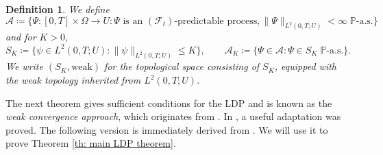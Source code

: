 \documentclass{amsart}
\newcommand{\<}{\langle}
\newcommand{\?}{\rangle}
\theoremstyle{plain}
\theoremstyle{remark}
\theoremstyle{plain}
\newtheorem{definition}[theorem]{Definition}
\numberwithin{equation}{section}
\newcommand{\F}{\mathcal{F}}
\renewcommand{\P}{\mathbb{P}}
\newcommand{\Om}{\Omega}
\begin{document}
\begin{definition}\label{def: S_K A_K}
We define
\[
\mathcal{A}\coloneqq \{\Psi\colon [0,T]\times \Om\to U : \Psi \text{ is an } (\F_t)\text{-predictable process}, \|\Psi\|_{L^2(0,T;U)}<\infty \; \P\text{-a.s.}\}
\]
and for $K>0$,
\[
S_K\coloneqq \{\psi\in L^2(0,T;U) : \|\psi\|_{L^2(0,T;U)}\leq K\},\qquad \mathcal{A}_K\coloneqq \{\Psi\in\mathcal{A}: \Psi\in S_K \; \P\text{-a.s.}\}.
\]
We write $(S_K,\mathrm{weak})$ for the topological space consisting of $S_K$, equipped with the weak topology inherited from $L^2(0,T;U)$.
\end{definition}

The next theorem gives sufficient conditions for the LDP and is known as the \emph{weak convergence approach}, which originates from \cite[Th. 4.4]{budhidupuis01}. In \cite{matoussi21}, a useful adaptation was proved. The following version is immediately derived from \cite[Th. 3.2]{matoussi21}. We will use it to prove Theorem \ref{th: main LDP theorem}.
\end{document}

